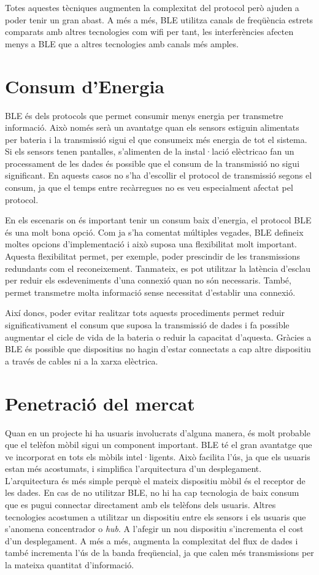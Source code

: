 Totes aquestes tècniques augmenten la complexitat del protocol però ajuden a poder tenir un gran abast.
A més a més, BLE utilitza canals de freqüència estrets comparats amb altres tecnologies com wifi per tant, les interferències afecten menys a BLE que a altres tecnologies amb canals més amples.

\section*{Consum d'Energia}

BLE és dels protocols que permet consumir menys energia per transmetre informació.
Això només serà un avantatge quan els sensors estiguin alimentats per bateria i la transmissió sigui el que consumeix més energia de tot el sistema.
Si els sensors tenen pantalles, s'alimenten de la instal·lació elèctricao fan un processament de les dades és possible que el consum de la transmissió no sigui significant.
En aquests casos no s'ha d'escollir el protocol de transmissió segons el consum, ja que el temps entre recàrregues no es veu especialment afectat pel protocol.

En els escenaris on és important tenir un consum baix d'energia, el protocol BLE és una molt bona opció.
Com ja s'ha comentat múltiples vegades, BLE defineix moltes opcions d'implementació i això suposa una flexibilitat molt important.
Aquesta flexibilitat permet, per exemple, poder prescindir de les transmissions redundants com el reconeixement.
Tanmateix, es pot utilitzar la latència d'esclau per reduir els esdeveniments d'una connexió quan no són necessaris.
També, permet transmetre molta informació sense necessitat d'establir una connexió.

Així doncs, poder evitar realitzar tots aquests procediments permet reduir significativament el consum que suposa la transmissió de dades i fa possible augmentar el cicle de vida de la bateria o reduir la capacitat d'aquesta.
Gràcies a BLE és possible que dispositius no hagin d'estar connectats a cap altre dispositiu a través de cables ni a la xarxa elèctrica.

\section*{Penetració del mercat}

Quan en un projecte hi ha usuaris involucrats d'alguna manera, és molt probable que el telèfon mòbil sigui un component important.
BLE té el gran avantatge que ve incorporat en tots els mòbils intel·ligents.
Això facilita l'ús, ja que els usuaris estan més acostumats, i simplifica l'arquitectura d'un desplegament.
L'arquitectura és més simple perquè el mateix dispositiu mòbil és el receptor de les dades.
En cas de no utilitzar BLE, no hi ha cap tecnologia de baix consum que es pugui connectar directament amb els telèfons dels usuaris.
Altres tecnologies acostumen a utilitzar un dispositiu entre els sensors i els usuaris que s'anomena concentrador o \textit{hub}.
A l'afegir un nou dispositiu s'incrementa el cost d'un desplegament.
A més a més, augmenta la complexitat del flux de dades i també incrementa l'ús de la banda freqüencial, ja que calen més transmissions per la mateixa quantitat d'informació.

